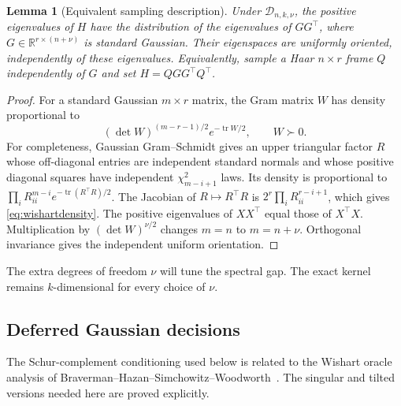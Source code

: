 \documentclass[11pt]{article}
\numberwithin{equation}{section}
\newtheorem{lemma}[theorem]{Lemma}
\theoremstyle{remark}\newtheorem{remark}[theorem]{Remark}
\newcommand{\R}{\mathbb R}
\newcommand{\tr}{\operatorname{tr}}
\newcommand{\calD}{\mathcal D}
\begin{document}
\begin{lemma}[Equivalent sampling description]\label{lem:sampling}
Under $\calD_{n,k,\nu}$, the positive eigenvalues of $H$ have the distribution of the eigenvalues of $GG^\top$, where $G\in\R^{r\times(n+\nu)}$ is standard Gaussian. Their eigenspaces are uniformly oriented, independently of these eigenvalues. Equivalently, sample a Haar $n\times r$ frame $Q$ independently of $G$ and set $H=QGG^\top Q^\top$.
\end{lemma}
\begin{proof}
For a standard Gaussian $m\times r$ matrix, the Gram matrix $W$ has density proportional to
\begin{equation}\label{eq:wishartdensity}
(\det W)^{(m-r-1)/2}e^{-\tr W/2},\qquad W\succ0.
\end{equation}
For completeness, Gaussian Gram--Schmidt gives an upper triangular factor $R$ whose off-diagonal entries are independent standard normals and whose positive diagonal squares have independent $\chi^2_{m-i+1}$ laws. Its density is proportional to $\prod_iR_{ii}^{m-i}e^{-\tr(R^\top R)/2}$. The Jacobian of $R\mapsto R^\top R$ is $2^r\prod_iR_{ii}^{r-i+1}$, which gives \eqref{eq:wishartdensity}. The positive eigenvalues of $XX^\top$ equal those of $X^\top X$. Multiplication by $(\det W)^{\nu/2}$ changes $m=n$ to $m=n+\nu$. Orthogonal invariance gives the independent uniform orientation.
\end{proof}
The extra degrees of freedom $\nu$ will tune the spectral gap. The exact kernel remains $k$-dimensional for every choice of $\nu$.

\subsection{Deferred Gaussian decisions}
The Schur-complement conditioning used below is related to the Wishart oracle analysis of Braverman--Hazan--Simchowitz--Woodworth~\cite{bhsw}. The singular and tilted versions needed here are proved explicitly.
\end{document}

